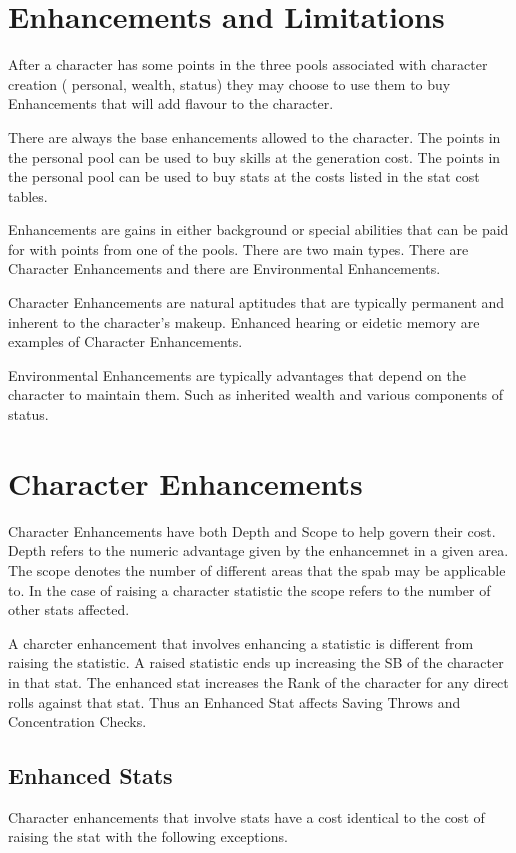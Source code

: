 \section{Enhancements and Limitations}

After a character has some points in the three pools associated with
character creation ( personal, wealth, status) they may choose to
use them to buy Enhancements that will add flavour to the character.

There are always the base enhancements allowed to the character. The
points in the personal pool can be used to buy skills at the generation
cost. The points in the personal pool can be used to buy stats at the costs
listed in the stat cost tables.

Enhancements are gains in either background or special abilities that
can be paid for with points from one of the pools. There are two main
types. There are Character Enhancements and there are
Environmental Enhancements.

Character Enhancements are natural aptitudes that are typically 
permanent and inherent to the character's makeup. Enhanced hearing or
eidetic memory are examples of Character Enhancements.

Environmental Enhancements are typically advantages that depend on  the
character to maintain them. Such as inherited wealth and various components 
of status.

\section{Character Enhancements}

Character Enhancements have both Depth and Scope to help govern their cost.
Depth refers to the numeric advantage given by the enhancemnet in a given
area. The scope denotes the number of different areas that the spab
may be applicable to. In the case of raising a character statistic the 
scope refers to the number of other stats affected.

A charcter enhancement that involves enhancing a statistic is different from 
raising the statistic. A raised statistic ends up increasing the SB of the 
character in that stat. The enhanced stat increases the Rank of the 
character for any direct rolls against that stat. Thus an Enhanced Stat
affects Saving Throws and Concentration Checks.

\subsection{Enhanced Stats}
Character enhancements that involve stats have a cost identical to the 
cost of raising the stat with the following exceptions.

